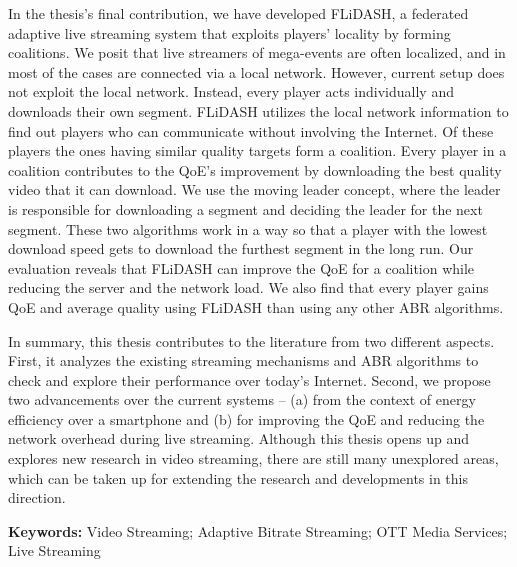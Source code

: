 {In the thesis's final contribution, we have developed FLiDASH, a federated adaptive live streaming system that exploits players' locality by forming coalitions. We posit that  live streamers of mega-events are often localized, and in most of the cases are connected via a local network. However, current setup does not exploit the local network. Instead, every player acts individually and downloads their own segment. FLiDASH utilizes the local network information to find out players who can communicate without involving the Internet. Of these players the ones having similar quality targets form a coalition. Every player in a coalition contributes to the QoE's improvement by downloading the best quality video that it can download. We use the moving leader concept, where the leader is responsible for downloading a segment and deciding the leader for the next segment. These two algorithms work in a way so that a player with the lowest download speed gets to download the furthest segment in the long run. Our evaluation reveals that FLiDASH can improve the QoE for a coalition while reducing the server and the network load. We also find that every player gains QoE and average quality using FLiDASH than using any other ABR algorithms.

In summary, this thesis contributes to the literature from two different aspects. First, it analyzes the existing streaming mechanisms and ABR algorithms to check and explore their performance over today's Internet. Second, we propose two advancements over the current systems -- (a) from the context of energy efficiency over a smartphone and (b) for improving the QoE and reducing the network overhead during live streaming. Although this thesis opens up and explores new research in video streaming, there are still many unexplored areas, which can be taken up for extending the research and developments in this direction. 

\textbf{Keywords:} Video Streaming; Adaptive Bitrate Streaming; OTT Media Services; Live Streaming
}


